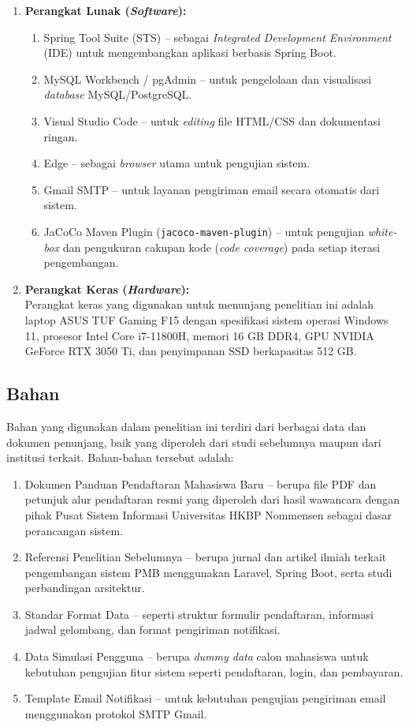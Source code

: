 \begin{enumerate}[noitemsep]
	\item \textbf{Perangkat Lunak (\textit{Software}):}
	\begin{enumerate}
		\item Spring Tool Suite (STS) -- sebagai \textit{Integrated Development Environment} (IDE) untuk mengembangkan aplikasi berbasis Spring Boot.
		\item MySQL Workbench / pgAdmin -- untuk pengelolaan dan visualisasi \textit{database} MySQL/PostgreSQL.
		\item Visual Studio Code -- untuk \textit{editing} file HTML/CSS dan dokumentasi ringan.
		\item Edge -- sebagai \textit{browser} utama untuk pengujian sistem.
		\item Gmail SMTP -- untuk layanan pengiriman email secara otomatis dari sistem.
		\item JaCoCo Maven Plugin (\texttt{jacoco-maven-plugin}) -- untuk pengujian \textit{white-box} dan pengukuran cakupan kode (\textit{code coverage}) pada setiap iterasi pengembangan.
	\end{enumerate}
	
	\item \textbf{Perangkat Keras (\textit{Hardware}):}\\
	Perangkat keras yang digunakan untuk menunjang penelitian ini adalah laptop ASUS TUF Gaming F15 dengan spesifikasi sistem operasi Windows 11, prosesor Intel Core i7-11800H, memori 16 GB DDR4, GPU NVIDIA GeForce RTX 3050 Ti, dan penyimpanan SSD berkapasitas 512 GB.
\end{enumerate}

\subsection{Bahan} \label{III.Bahan}
Bahan yang digunakan dalam penelitian ini terdiri dari berbagai data dan dokumen penunjang, baik yang diperoleh dari studi sebelumnya maupun dari institusi terkait. Bahan-bahan tersebut adalah:\par

\begin{enumerate}[noitemsep]
	\item Dokumen Panduan Pendaftaran Mahasiswa Baru -- berupa file PDF dan petunjuk alur pendaftaran resmi yang diperoleh dari hasil wawancara dengan pihak Pusat Sistem Informasi Universitas HKBP Nommensen sebagai dasar perancangan sistem.
	\item Referensi Penelitian Sebelumnya -- berupa jurnal dan artikel ilmiah terkait pengembangan sistem PMB menggunakan Laravel, Spring Boot, serta studi perbandingan arsitektur.
	\item Standar Format Data -- seperti struktur formulir pendaftaran, informasi jadwal gelombang, dan format pengiriman notifikasi.
	\item Data Simulasi Pengguna -- berupa \textit{dummy data} calon mahasiswa untuk kebutuhan pengujian fitur sistem seperti pendaftaran, login, dan pembayaran.
	\item Template Email Notifikasi -- untuk kebutuhan pengujian pengiriman email menggunakan protokol SMTP Gmail.
\end{enumerate}

